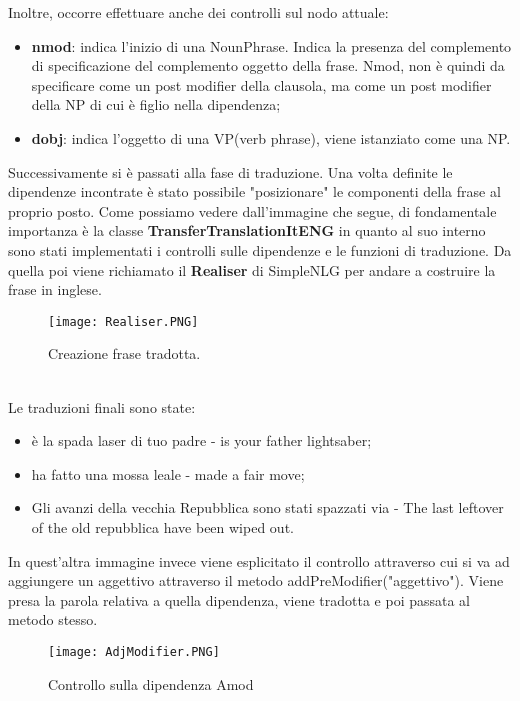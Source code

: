 Inoltre, occorre effettuare anche dei controlli sul nodo attuale:
\begin{itemize}
	\item \textbf{nmod}: indica l’inizio di una NounPhrase. Indica la presenza del complemento di specificazione del complemento oggetto della frase. Nmod, non è quindi da specificare come un post modifier della clausola, ma come un post modifier della NP di cui è figlio nella dipendenza;
	\item \textbf{dobj}: indica l’oggetto di una VP(verb phrase), viene istanziato come una NP.
\end{itemize}
Successivamente si è passati alla fase di traduzione. Una volta definite le dipendenze incontrate è stato possibile "posizionare" le componenti della frase al proprio posto. Come possiamo vedere dall'immagine che segue, di fondamentale importanza è la classe \textbf{TransferTranslationItENG} in quanto al suo interno sono stati implementati i controlli sulle dipendenze e le funzioni di traduzione. Da quella poi viene richiamato il \textbf{Realiser} di SimpleNLG per andare a costruire la frase in inglese.  
\begin{figure}[h!]
	\texttt{[image: Realiser.PNG]}
	\centering
	\caption{Creazione frase tradotta.}
	\label{fig:PM}
\end{figure}
\\
Le traduzioni finali sono state:
\begin{itemize}
	\item è la spada laser di tuo padre - is your father lightsaber;
	\item ha fatto una mossa leale - made a fair move;
	\item Gli avanzi della vecchia Repubblica sono stati spazzati via - The last leftover of the old repubblica have been wiped out.
\end{itemize}
In quest'altra immagine invece viene esplicitato il controllo attraverso cui si va ad aggiungere un aggettivo attraverso il metodo addPreModifier("aggettivo"). Viene presa la parola relativa a quella dipendenza, viene tradotta e poi passata al metodo stesso.
\begin{figure}[h!]
	\texttt{[image: AdjModifier.PNG]}
	\centering
	\caption{Controllo sulla dipendenza Amod}
	\label{fig:PM}
\end{figure}
\clearpage
